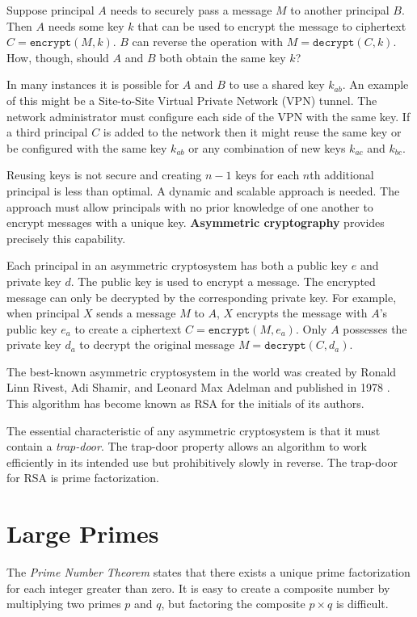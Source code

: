 \documentclass{book}
\begin{document}
Suppose principal $A$ needs to securely pass a message $M$ to another principal $B$. Then $A$ needs some key $k$ that can be used to encrypt the message to ciphertext $C=\texttt{encrypt}(M,k)$. $B$ can reverse the operation with $M=\texttt{decrypt}(C,k)$. How, though, should $A$ and $B$ both obtain the same key $k$?

In many instances it is possible for $A$ and $B$ to use a shared key $k_{ab}$. An example of this might be a Site-to-Site Virtual Private Network (VPN) tunnel. The network administrator must configure each side of the VPN with the same key. If a third principal $C$ is added to the network then it might reuse the same key or be configured with the same key $k_{ab}$ or any combination of new keys $k_{ac}$ and $k_{bc}$.

Reusing keys is not secure and creating $n-1$ keys for each $n$th additional principal is less than optimal. A dynamic and scalable approach is needed. The approach must allow principals with no prior knowledge of one another to encrypt messages with a unique key. \textbf{Asymmetric cryptography} provides precisely this capability.

Each principal in an asymmetric cryptosystem has both a public key $e$ and private key $d$. The public key is used to encrypt a message. The encrypted message can only be decrypted by the corresponding private key. For example, when principal $X$ sends a message $M$ to $A$, $X$ encrypts the message with $A$'s public key $e_a$ to create a ciphertext $C=\texttt{encrypt}(M,e_a)$. Only $A$ possesses the private key $d_a$ to decrypt the original message $M=\texttt{decrypt}(C,d_a)$.

The best-known asymmetric cryptosystem in the world was created by Ronald Linn Rivest, Adi Shamir, and Leonard Max Adelman and published in 1978 \cite{Rivest:1978:MOD:359340.359342}. This algorithm has become known as RSA for the initials of its authors.

The essential characteristic of any asymmetric cryptosystem is that it must contain a \textit{trap-door}. The trap-door property allows an algorithm to work efficiently in its intended use but prohibitively slowly in reverse. The trap-door for RSA is prime factorization.

\section{Large Primes}

The \textit{Prime Number Theorem} states that there exists a unique prime factorization for each integer greater than zero. It is easy to create a composite number by multiplying two primes $p$ and $q$, but factoring the composite $p \times q$ is difficult.
\end{document}
